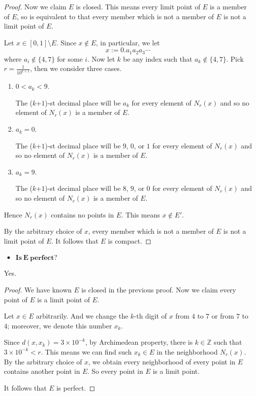 \begin{Exercise}
\begin{proof}
		Now we claim $E$ is closed. This means every limit point of $E$ is a member of $E$, so is equivalent to that every member which is not a member of $E$ is not a limit point of $E$.
		
		Let $x\in[0,1]\setminus E$. Since $x\notin E$, in particular, we let
		$$
		x := 0.a_1 a_2 a_3 \cdots
		$$
		where $a_i\notin \{4,7\}$ for some $i$. Now let $k$ be any index such that $a_k\notin\{4,7\}$. Pick $r = \frac{1}{10^{k+1}}$, then we consider three cases.
		
		\begin{enumerate}
			\item $0 < a_k < 9$.
			
			The ($k$+$1$)-st decimal place will be $a_k$ for every element of $N_r(x)$ and so no element of $N_r(x)$ is a member of $E$.
			
			\item $a_k = 0$.
			
			The ($k$+$1$)-st decimal place will be $9$, $0$, or $1$ for every element of $N_r(x)$ and so no element of $N_r(x)$ is a member of $E$.
			
			\item $a_k = 9$.
			
			The ($k$+$1$)-st decimal place will be $8$, $9$, or $0$ for every element of $N_r(x)$ and so no element of $N_r(x)$ is a member of $E$.
		\end{enumerate}
		Hence $N_r(x)$ contains no points in $E$. This means $x\notin E'$.
		
		By the arbitrary choice of $x$, every member which is not a member of $E$ is not a limit point of $E$. It follows that $E$ is compact.
	\end{proof}
	
	\begin{itemize}
		\item $\mathbf{Is\ E\ perfect?}$
	\end{itemize}
	\begin{answer}
		Yes.
	\end{answer}
	\begin{proof}
		We have known $E$ is closed in the previous proof. Now we claim every point of $E$ is a limit point of $E$.
		
		Let $x\in E$ arbitrarily. And we change the $k$-th digit of $x$ from $4$ to $7$ or from $7$ to $4$; moreover, we denote this number $x_k$.
		
		Since $d(x, x_k)=3\times 10^{-k}$, by Archimedean property, there is $k\in\mathbb{Z}$ such that $3\times 10^{-k} < r$. This means we can find such $x_k\in E$ in the neighborhood $N_r(x)$. By the arbitrary choice of $x$, we obtain every neighborhood of every point in $E$ contains another point in $E$. So every point in $E$ is a limit point.
		
		It follows that $E$ is perfect.
	\end{proof}
\end{Exercise}